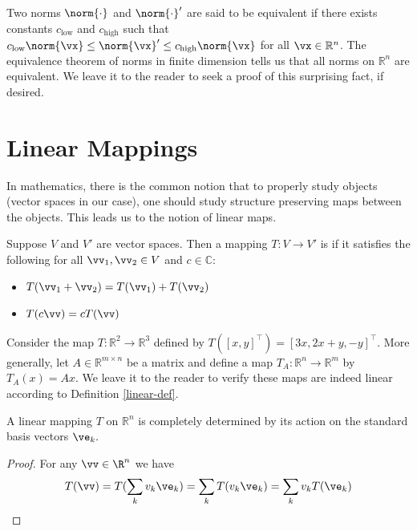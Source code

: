 Two norms $\norm{\cdot}$ and $\norm{\cdot}'$ are said to be equivalent if there exists constants $c_{\text{low}}$ and $c_{\text{high}}$ such that 
$c_{\text{low}} \norm{\vx} \leq \norm{\vx}' \leq c_{\text{high}} \norm{\vx}$
for all $\vx \in \mathbb R^n$. The equivalence theorem of norms in finite dimension tells us that all norms on $\mathbb R^n$ are equivalent. We leave it to the reader to seek a proof of this surprising fact, if desired.

\section{Linear Mappings} 

In mathematics, there is the common notion that to properly study objects (vector spaces in our case), one should study structure preserving maps between the objects. This leads us to the notion of linear maps.

\begin{definition}\label{linear-def}
Suppose $V$ and $V'$ are vector spaces. Then a mapping $T : V \rightarrow V'$ is  if it satisfies the following for all $\vv_1, \vv_2 \in V$ and $c \in \mathbb C$:
\begin{itemize}
\item $T(\vv_1 + \vv_2) = T(\vv_1) + T(\vv_2)$
\item $T(c\vv) = c T(\vv)$
\end{itemize}
\end{definition}

\begin{example}\label{lin-map-ex}
Consider the map $T : \mathbb R^2 \to \mathbb R^3$ defined by
$T([x,y]^\top)=[3x, 2x + y, -y]^\top$.
More generally, let $A\in\mathbb{R}^{m\times n}$ be a matrix and define a map $T_A:\mathbb{R}^n\to\mathbb{R}^m$ by $T_A(x)=Ax$. 
We leave it to the reader to verify these maps are indeed linear according to Definition \ref{linear-def}. 
\end{example}

\begin{proposition} 
A linear mapping $T$ on $\mathbb R^n$ is completely determined by its action on the standard basis vectors $\ve_k.$
\end{proposition}

\begin{proof} For any $\vv\in\R^n$ we have
$$
T(\vv) = 
T(\sum_{k } v_k \ve_k) = 
\sum_k T(v_k \ve_k) = 
\sum_k v_k T(\ve_k)\qedhere
$$
\end{proof}

